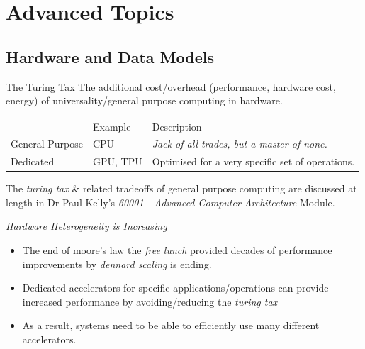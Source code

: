 \chapter{Advanced Topics}

\section{Hardware and Data Models}
\begin{sidenotebox}{The Turing Tax}
    The additional cost/overhead (performance, hardware cost, energy) of universality/general purpose computing in hardware.
    \begin{center}
        \begin{tabular}{l l p{}}
            & Example & Description \\
            General Purpose & CPU & \textit{Jack of all trades, but a master of none.} \\
            Dedicated & GPU, TPU & Optimised for a very specific set of operations. \\
        \end{tabular}
    \end{center}
    The  \textit{turing tax} \& related tradeoffs of general purpose computing are discussed at length in Dr Paul Kelly's \textit{60001 - Advanced Computer Architecture} Module.
\end{sidenotebox}
\noindent
\centerline{\textit{Hardware Heterogeneity is Increasing}}
\begin{itemize}
    \item The end of moore's law the \textit{free lunch} provided decades of performance improvements by \textit{dennard scaling} is ending.
    \item Dedicated accelerators for specific applications/operations can provide increased performance by avoiding/reducing the \textit{turing tax}
    \item As a result, systems need to be able to efficiently use many different accelerators.
\end{itemize}

